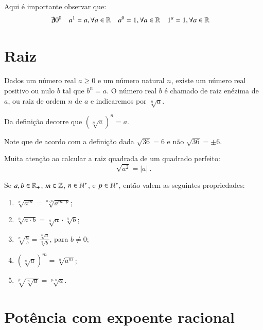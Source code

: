   \vskip0.3cm

 \colorbox{amarelo}{
 \begin{minipage}{0.9\linewidth}
 \begin{center}
 Aqui é importante observar que:
 \begin{align*}
 & \nexists 0^0 & & a^1= a, \forall a \in \mathbb{R} & & a^0= 1, \forall a \in \mathbb{R} & & 1^a= 1, \forall a \in \mathbb{R}
 \end{align*}
 \end{center}
 \end{minipage}}
 
\vskip0.3cm 

 \section{Raiz}
 
 Dados um número real $a \geq 0$ e um número natural $n$, existe um número real positivo ou nulo $b$ tal que $b^n= a$. O número real $b$ é chamado de raiz enézima de $a$, ou raiz de ordem $n$ de $a$ e indicaremos por $\sqrt[n]{a}$.
 
 \begin{obs}
 Da definição decorre que $(\sqrt[n]{a})^n=a$.
 \end{obs}
 
 \begin{obs}
 Note que de acordo com a definição dada $\sqrt{36}= 6$ e não $\sqrt{36}= \pm 6$.
 \end{obs}
 
 \begin{obs}
 Muita atenção ao calcular a raiz quadrada de um quadrado perfeito:
 \[\sqrt{a^2}= |a| \ . \]
 \end{obs}
 
 Se $a, b \in \mathbb{R}_{+}$, $m \in \mathbb{Z}$, $n \in \mathbb{N}^{*}$, e $p \in \mathbb{N}^{*}$, então valem as seguintes propriedades:
 \begin{enumerate}[R1)]
 \item $\sqrt[n]{a^m}= \sqrt[n \cdot p]{a^{m\cdot p}}$;
 \item $\sqrt[n]{a \cdot b}= \sqrt[n]{a} \cdot \sqrt[n]{b}$;
 \item $\sqrt[n]{\frac{a}{b}}= \frac{\sqrt[n]{a}}{\sqrt[n]{b}}$, para $b \neq 0$;
 \item $(\sqrt[n]{a})^m= \sqrt[n]{a^m}$;
 \item $\sqrt[p]{\sqrt[n]{a}}= \sqrt[p \cdot n]{a}$.
 \end{enumerate}

 \section{Potência com expoente racional}
 

